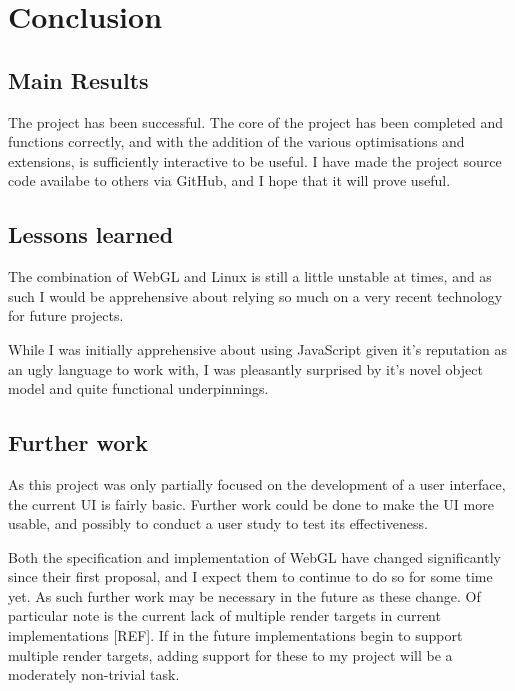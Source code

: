 \documentclass[12pt,twoside,notitlepage]{report}
\begin{document}
\cleardoublepage
\chapter{Conclusion}

\section{Main Results}
The project has been successful. The core of the project has been completed and functions correctly, and with the addition of the various optimisations and extensions, is sufficiently interactive to be useful. I have made the project source code availabe to others via GitHub, and I hope that it will prove useful.

\section{Lessons learned}
The combination of WebGL and Linux is still a little unstable at times, and as such I would be apprehensive about relying so much on a very recent technology for future projects.

While I was initially apprehensive about using JavaScript given it's reputation as an ugly language to work with, I was pleasantly surprised by it's novel object model and quite functional underpinnings.

\section{Further work}
As this project was only partially focused on the development of a user interface, the current UI is fairly basic. Further work could be done to make the UI more usable, and possibly to conduct a user study to test its effectiveness.

Both the specification and implementation of WebGL have changed significantly since their first proposal, and I expect them to continue to do so for some time yet. As such further work may be necessary in the future as these change. Of particular note is the current lack of multiple render targets in current implementations [REF]. If in the future implementations begin to support multiple render targets, adding support for these to my project will be a moderately non-trivial task.

\cleardoublepage

\end{document}
